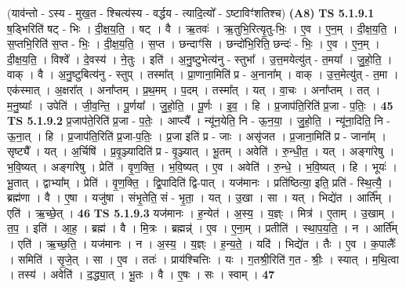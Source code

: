 \documentclass[17pt]{extarticle}
\begin{document}
                  \newline
                      (याव॑न्तो - ऽस्य - मुख॒त - श्चित्य॑स्य - वर्द्धय - त्यादि॒त्यो᳚ - ऽष्टाविꣳ॑शतिश्च)  \textbf{(A8)} \newline \newline
                                \textbf{ TS 5.1.9.1} \newline
                  ष॒ड्भिरिति॑ षट् - भिः । दी॒क्ष॒य॒ति॒ । षट् । वै । ऋ॒तवः॑ । ऋ॒तुभि॒रित्यृ॒तु-भिः॒ । ए॒व । ए॒न॒म् । दी॒क्ष॒य॒ति॒ । स॒प्तभि॒रिति॑ स॒प्त - भिः॒ । दी॒क्ष॒य॒ति॒ । स॒प्त । छन्दाꣳ॑सि । छन्दो॑भि॒रिति॒ छन्दः॑ - भिः॒ । ए॒व । ए॒न॒म् । दी॒क्ष॒य॒ति॒ । विश्वे᳚ । दे॒वस्य॑ । ने॒तुः । इति॑ । अ॒नु॒ष्टुभेत्य॑नु - स्तुभा᳚ । उ॒त्त॒मयेत्यु॑त् - त॒मया᳚ । जु॒हो॒ति॒ । वाक् । वै । अ॒नु॒ष्टुबित्य॑नु - स्तुप् । तस्मा᳚त् । प्रा॒णाना॒मिति॑ प्र - अ॒नाना᳚म् । वाक् । उ॒त्त॒मेत्यु॑त् - त॒मा । एक॑स्मात् । अ॒क्षरा᳚त् । अना᳚प्तम् । प्र॒थ॒मम् । प॒दम् । तस्मा᳚त् । यत् । वा॒चः । अना᳚प्तम् । तत् । म॒नु॒ष्याः᳚ । उपेति॑ । जी॒व॒न्ति॒ । पू॒र्णया᳚ । जु॒हो॒ति॒ । पू॒र्णः । इ॒व॒ । हि । प्र॒जाप॑ति॒रिति॑ प्र॒जा - प॒तिः॒ । \textbf{  45} \newline
                  \newline
                                \textbf{ TS 5.1.9.2} \newline
                  प्र॒जाप॑ते॒रिति॑ प्र॒जा - प॒तेः॒ । आप्त्यै᳚ । न्यू॑न॒येति॒ नि - ऊ॒न॒या॒ । जु॒हो॒ति॒ । न्यू॑ना॒दिति॒ नि - ऊ॒ना॒त् । हि । प्र॒जाप॑ति॒रिति॑ प्र॒जा-प॒तिः॒ । प्र॒जा इति॑ प्र - जाः । असृ॑जत । प्र॒जाना॒मिति॑ प्र - जाना᳚म् । सृष्ट्यै᳚ । यत् । अ॒र्चिषि॑ । प्र॒वृ॒ञ्ज्यादिति॑ प्र - वृ॒ञ्ज्यात् । भू॒तम् । अवेति॑ । रु॒न्धी॒त॒ । यत् । अङ्गा॑रेषु । भ॒वि॒ष्यत् । अङ्गा॑रेषु । प्रेति॑ । वृ॒ण॒क्ति॒ । भ॒वि॒ष्यत् । ए॒व । अवेति॑ । रु॒न्धे॒ । भ॒वि॒ष्यत् । हि । भूयः॑ । भू॒तात् । द्वाभ्या᳚म् । प्रेति॑ । वृ॒ण॒क्ति॒ । द्वि॒पादिति॑ द्वि-पात् । यज॑मानः । प्रति॑ष्ठित्या॒ इति॒ प्रति॑ - स्थि॒त्यै॒ । ब्रह्म॑णा । वै । ए॒षा । यजु॑षा । संभृ॒तेति॒ सं - भृ॒ता॒ । यत् । उ॒खा । सा । यत् । भिद्ये॑त । आर्ति᳚म् । एति॑ । ऋ॒च्छे॒त् । \textbf{  46} \newline
                  \newline
                                \textbf{ TS 5.1.9.3} \newline
                  यज॑मानः । ह॒न्येत॑ । अ॒स्य॒ । य॒ज्ञ्ः । मित्र॑ । ए॒ताम् । उ॒खाम् । त॒प॒ । इति॑ । आ॒ह॒ । ब्रह्म॑ । वै । मि॒त्रः । ब्रह्मन्न्॑ । ए॒व । ए॒ना॒म् । प्रतीति॑ । स्था॒प॒य॒ति॒ । न । आर्ति᳚म् । एति॑ । ऋ॒च्छ॒ति॒ । यज॑मानः । न । अ॒स्य॒ । य॒ज्ञ्ः । ह॒न्य॒ते॒ । यदि॑ । भिद्ये॑त । तैः । ए॒व । क॒पालैः᳚ । समिति॑ । सृ॒जे॒त् । सा । ए॒व । ततः॑ । प्राय॑श्चित्तिः । यः । ग॒तश्री॒रिति॑ ग॒त - श्रीः॒ । स्यात् । म॒थि॒त्वा । तस्य॑ । अवेति॑ । द॒द्ध्या॒त् । भू॒तः । वै । ए॒षः । सः । स्वाम् । \textbf{  47} \newline
\end{document}
